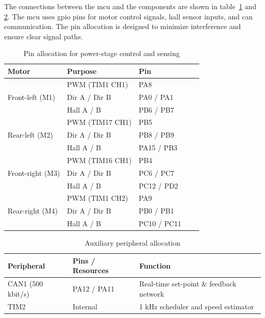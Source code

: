 The connections between the \gls{mcu} and the components are shown in table~\ref{tab:gpio-table} and \ref{tab:aux-peripherals}. The \gls{mcu} uses \gls{gpio} pins for motor control signals, \gls{hall} sensor inputs, and \gls{can} communication. The pin allocation is designed to minimize interference and ensure clear signal paths.

\begin{table}[H]
  \centering
  \begin{tabular}{@{}lll l l@{}}
    \toprule
    \textbf{Motor}                    & \textbf{Purpose} & \textbf{Pin} \\
    \midrule
    \multirow{3}{*}{Front-left (M1)}  & PWM (TIM1 CH1)   & PA8          \\
                                      & Dir A / Dir B    & PA0 / PA1    \\
                                      & Hall A / B       & PB6 / PB7    \\
    \midrule
    \multirow{3}{*}{Rear-left (M2)}   & PWM (TIM17 CH1)  & PB5          \\
                                      & Dir A / Dir B    & PB8 / PB9    \\
                                      & Hall A / B       & PA15 / PB3   \\
    \midrule
    \multirow{3}{*}{Front-right (M3)} & PWM (TIM16 CH1)  & PB4          \\
                                      & Dir A / Dir B    & PC6 / PC7    \\
                                      & Hall A / B       & PC12 / PD2   \\
    \midrule
    \multirow{3}{*}{Rear-right (M4)}  & PWM (TIM1 CH2)   & PA9          \\
                                      & Dir A / Dir B    & PB0 / PB1    \\
                                      & Hall A / B       & PC10 / PC11  \\
    \bottomrule
  \end{tabular}
  \caption{Pin allocation for power-stage control and sensing}
  \label{tab:gpio-table}
\end{table}

\begin{table}[H]
  \centering
  \begin{tabular}{@{}lll@{}}
    \toprule
    \textbf{Peripheral} & \textbf{Pins / Resources} & \textbf{Function}                       \\
    \midrule
    CAN1 (500 kbit/s)   & PA12 / PA11               & Real-time set-point \& feedback network \\
    TIM2                & Internal                  & 1 kHz scheduler and speed estimator     \\
    \bottomrule
  \end{tabular}
  \caption{Auxiliary peripheral allocation}
  \label{tab:aux-peripherals}
\end{table}


